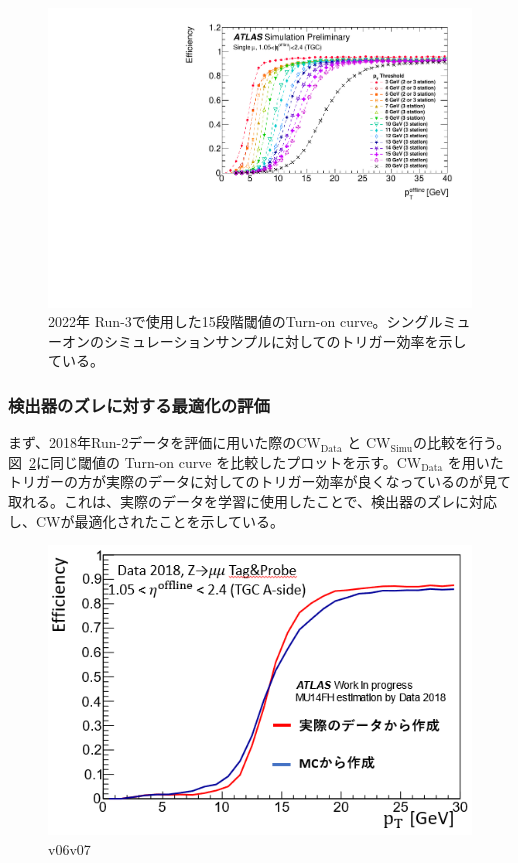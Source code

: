 \begin{figure}[tb]
  \centering
  \includegraphics[clip, width=12cm]{fig/3/PLOT-TRIG-2020-01-fig1.pdf}
  \caption{2022年 Run-3で使用した15段階閾値のTurn-on curve。シングルミューオンのシミュレーションサンプルに対してのトリガー効率を示している。}
  \label{fig:Run3_15_MC5}
\end{figure}

\subsubsection{検出器のズレに対する最適化の評価}
まず、2018年Run-2データを評価に用いた際の$\mathrm{CW_{Data}}$ と $\mathrm{CW_{Simu}}$の比較を行う。図~\ref{fig:v06v07}に同じ閾値の Turn-on curve を比較したプロットを示す。$\mathrm{CW_{Data}}$ を用いたトリガーの方が実際のデータに対してのトリガー効率が良くなっているのが見て取れる。これは、実際のデータを学習に使用したことで、検出器のズレに対応し、CWが最適化されたことを示している。
\begin{figure}[tb]
  \centering
  \includegraphics[clip, width=12cm]{fig/4/hikaku_v06_v07.png}
  \caption{v06v07}
  \label{fig:v06v07}
\end{figure}

